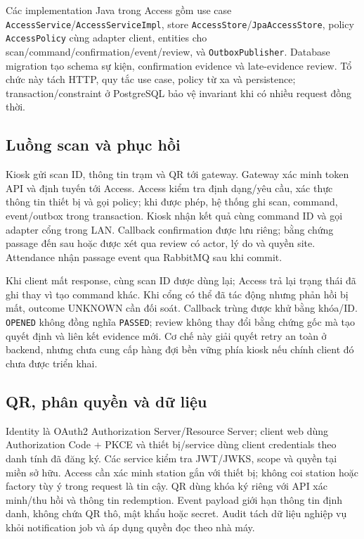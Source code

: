 Các implementation Java trong Access gồm use case \texttt{AccessService}\allowbreak/\texttt{AccessServiceImpl}, store \texttt{AccessStore}\allowbreak/\texttt{JpaAccessStore}, policy \texttt{AccessPolicy} cùng adapter client, entities cho scan/command/confirmation/event/review, và \texttt{OutboxPublisher}. Database migration tạo schema sự kiện, confirmation evidence và late-evidence review. Tổ chức này tách HTTP, quy tắc use case, policy từ xa và persistence; transaction/constraint ở PostgreSQL bảo vệ invariant khi có nhiều request đồng thời.

\subsection{Luồng scan và phục hồi}
\label{subsec:scan-recovery}
Kiosk gửi scan ID, thông tin trạm và QR tới gateway. Gateway xác minh token API và định tuyến tới Access. Access kiểm tra định dạng/yêu cầu, xác thực thông tin thiết bị và gọi policy; khi được phép, hệ thống ghi scan, command, event/outbox trong transaction. Kiosk nhận kết quả cùng command ID và gọi adapter cổng trong LAN. Callback confirmation được lưu riêng; bằng chứng passage đến sau hoặc được xét qua review có actor, lý do và quyền site. Attendance nhận passage event qua RabbitMQ sau khi commit.

Khi client mất response, cùng scan ID được dùng lại; Access trả lại trạng thái đã ghi thay vì tạo command khác. Khi cổng có thể đã tác động nhưng phản hồi bị mất, outcome UNKNOWN cần đối soát. Callback trùng được khử bằng khóa/ID. \texttt{OPENED} không đồng nghĩa \texttt{PASSED}; review không thay đổi bằng chứng gốc mà tạo quyết định và liên kết evidence mới. Cơ chế này giải quyết retry an toàn ở backend, nhưng chưa cung cấp hàng đợi bền vững phía kiosk nếu chính client đó chưa được triển khai.

\subsection{QR, phân quyền và dữ liệu}
\label{subsec:security-data}
Identity là OAuth2 Authorization Server/Resource Server; client web dùng Authorization Code + PKCE và thiết bị/service dùng client credentials theo danh tính đã đăng ký. Các service kiểm tra JWT/JWKS, scope và quyền tại miền sở hữu. Access cần xác minh station gắn với thiết bị; không coi station hoặc factory tùy ý trong request là tin cậy. QR dùng khóa ký riêng với API xác minh/thu hồi và thông tin redemption. Event payload giới hạn thông tin định danh, không chứa QR thô, mật khẩu hoặc secret. Audit tách dữ liệu nghiệp vụ khỏi notification job và áp dụng quyền đọc theo nhà máy.

